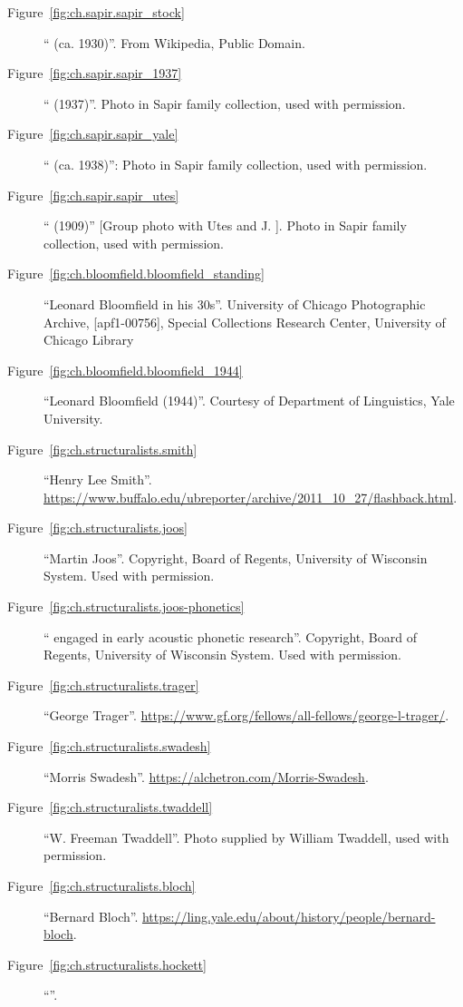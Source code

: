 \begin{description}
\item[Figure~\ref{fig:ch.sapir.sapir_stock}] ``
  (ca. 1930)''. From Wikipedia, Public Domain.
\item[Figure~\ref{fig:ch.sapir.sapir_1937}] ``
  (1937)''. Photo in Sapir family collection, used with permission.
\item[Figure~\ref{fig:ch.sapir.sapir_yale}] `` (ca. 1938)'':
  Photo in Sapir family collection, used with permission.
\item[Figure~\ref{fig:ch.sapir.sapir_utes}] `` (1909)''
  {[Group photo with Utes and J. ]}. Photo in Sapir family
  collection, used with permission.
\item[Figure~\ref{fig:ch.bloomfield.bloomfield_standing}] ``Leonard
  Bloomfield in his 30s''. University of Chicago Photographic Archive,
  [apf1-00756], Special Collections Research Center, University of
  Chicago Library
\item[Figure~\ref{fig:ch.bloomfield.bloomfield_1944}] ``Leonard
  Bloomfield (1944)''. Courtesy of Department of Linguistics, Yale University.
\item[Figure~\ref{fig:ch.structuralists.smith}] ``Henry Lee
  Smith''. 
  \url{https://www.buffalo.edu/ubreporter/archive/2011_10_27/flashback.html}.
\item[Figure~\ref{fig:ch.structuralists.joos}] ``Martin
  Joos''. Copyright, Board of
  Regents, University of Wisconsin System. Used with permission.
\item[Figure~\ref{fig:ch.structuralists.joos-phonetics}] ``
  engaged in early acoustic phonetic research''. Copyright, Board of
  Regents, University of Wisconsin System. Used with permission.
\item[Figure~\ref{fig:ch.structuralists.trager}] ``George
  Trager''. \url{https://www.gf.org/fellows/all-fellows/george-l-trager/}.
\item[Figure~\ref{fig:ch.structuralists.swadesh}] ``Morris
  Swadesh''.  \url{https://alchetron.com/Morris-Swadesh}.
\item[Figure~\ref{fig:ch.structuralists.twaddell}] ``W. Freeman
  Twaddell''. Photo supplied by William Twaddell, used with permission.
\item[Figure~\ref{fig:ch.structuralists.bloch}] ``Bernard
  Bloch''. \url{https://ling.yale.edu/about/history/people/bernard-bloch}. 
\item[Figure~\ref{fig:ch.structuralists.hockett}] ``''.

\end{description}
